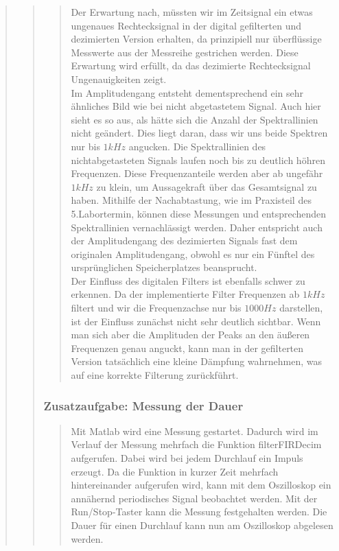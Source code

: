 \begin{quote}
\begin{quote}
\begin{quote}
        	\vspace{1.5em}
        	
        	Der Erwartung nach, müssten wir im Zeitsignal ein etwas ungenaues
        	Rechtecksignal in der digital gefilterten und dezimierten
        	Version erhalten, da prinzipiell nur überflüssige Messwerte aus der
        	Messreihe gestrichen werden. Diese Erwartung wird erfüllt, da das
        	dezimierte Rechtecksignal Ungenauigkeiten zeigt.\\
        	Im Amplitudengang entsteht dementsprechend ein sehr ähnliches Bild wie
        	bei nicht abgetastetem Signal. Auch hier sieht es so aus, als hätte
        	sich die Anzahl der Spektrallinien nicht geändert. Dies liegt daran,
        	dass wir uns beide Spektren nur bis $1kHz$ angucken. Die Spektrallinien
        	des nichtabgetasteten Signals laufen noch bis zu deutlich höhren
        	Frequenzen. Diese Frequenzanteile werden aber ab ungefähr $1kHz$ zu
        	klein, um Aussagekraft über das Gesamtsignal zu haben. Mithilfe der
        	Nachabtastung, wie im Praxisteil des 5.Labortermin, können diese
        	Messungen und entsprechenden Spektrallinien vernachlässigt werden.
        	Daher entspricht auch der Amplitudengang des dezimierten Signals fast
        	dem originalen Amplitudengang, obwohl es nur ein Fünftel des
        	ursprünglichen Speicherplatzes beansprucht.\\
        	Der Einfluss des digitalen Filters ist ebenfalls schwer zu erkennen. Da
        	der implementierte Filter Frequenzen ab $1kHz$ filtert und wir die
        	Frequenzachse nur bis $1000 Hz$ darstellen, ist der Einfluss
        	zunächst nicht sehr deutlich sichtbar. Wenn man sich aber die
        	Amplituden der Peaks an den äußeren Frequenzen genau anguckt, kann man in der gefilterten Version
        	tatsächlich eine kleine Dämpfung wahrnehmen, was auf eine korrekte
        	Filterung zurückführt.
        	
        	\end{quote}
        
        
        \subsubsection{Zusatzaufgabe: Messung der Dauer}
		\begin{quote}
			Mit Matlab wird eine Messung gestartet. Dadurch wird im Verlauf der Messung mehrfach die 
            Funktion filterFIRDecim aufgerufen. Dabei wird bei jedem Durchlauf
            ein Impuls erzeugt. Da die Funktion in kurzer Zeit mehrfach hintereinander aufgerufen wird, 
            kann mit dem Oszilloskop ein annähernd periodisches Signal
            beobachtet werden. Mit der Run/Stop-Taster kann die Messung festgehalten werden. 
            Die Dauer für einen Durchlauf kann nun am Oszilloskop abgelesen
            werden.\\
        

\end{quote}
\end{quote}
\end{quote}
